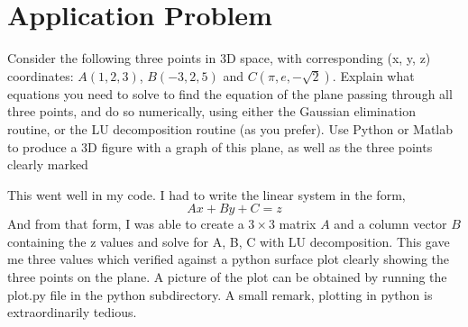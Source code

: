 \documentclass{article}
\begin{document}
\section{Application Problem}

Consider the following three points in 3D space, with corresponding (x, y, z)
coordinates: $A(1, 2, 3)$, $B(-3, 2, 5)$ and $C(\pi, e, -\sqrt{2})$. Explain what equations
you need to solve to find the equation of the plane passing through all three
points, and do so numerically, using either the Gaussian elimination routine, or
the LU decomposition routine (as you prefer). Use Python or Matlab to produce
a 3D figure with a graph of this plane, as well as the three points clearly marked

This went well in my code. I had to write the linear system in the form,
\[
    Ax + By + C = z
\]
And from that form, I was able to create a $3\times 3$ matrix $A$ and a column vector $B$ containing the z values and solve for A, B, C with LU decomposition. This gave me three values which verified against a python surface plot clearly showing the three points on the plane. A picture of the plot can be obtained by running the plot.py file in the python subdirectory. A small remark, plotting in python is extraordinarily tedious. 
\emp
\end{document}
